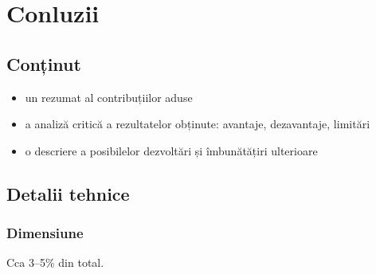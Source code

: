 \chapter{Conluzii}


\section{Conținut}

\begin{itemize}
 \item un rezumat al contribuțiilor aduse
 \item a analiză critică a rezultatelor obținute: avantaje, dezavantaje, limitări
 \item o descriere a posibilelor dezvoltări și îmbunătățiri ulterioare
\end{itemize}


\section{Detalii tehnice}

\subsection{Dimensiune}

Cca 3--5\% din total.







